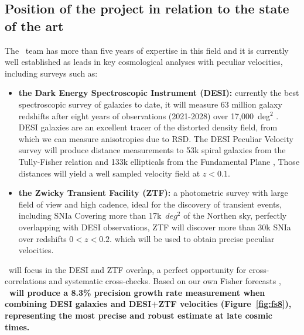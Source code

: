 

\subsection{Position of the project in relation to the state of the art}

The \projacro\ team has more than five years of expertise in this field and it is currently
well established as leads in key cosmological analyses with peculiar velocities, 
including surveys such as:
\begin{itemize}
  \item \textbf{the Dark Energy Spectroscopic Instrument (DESI):} 
  currently the best spectroscopic survey of galaxies to date, it will measure 
  63 million galaxy redshifts after eight years of observations (2021-2028) over 17,000~deg$^2$
  \cite{desicollaborationOverviewInstrumentationDark2022}.
  DESI galaxies are an excellent tracer of the distorted density field, 
  from which we can measure anisotropies due to RSD. 
  The DESI Peculiar Velocity survey will produce distance measurements to 
  53k spiral galaxies from the Tully-Fisher relation and 133k ellipticals 
  from the Fundamental Plane \cite{saulderTargetSelectionDESI2023},%
  Those distances will yield a well sampled velocity field at $z<0.1$.
  
  \item \textbf{the Zwicky Transient Facility (ZTF):} 
  a photometric survey with large field of view and high cadence, ideal for the 
  discovery of transient events, including SNIa \cite{bellmZwickyTransientFacility2019}%
  Covering more than 17k~$deg^2$ of the Northen sky, perfectly overlapping with DESI
  observations, ZTF will discover more than 30k SNIa over redshifts $0 < z < 0.2$. 
  which will be used to obtain precise peculiar velocities.
\end{itemize}
\projacro\ will focus in the DESI and ZTF overlap, a perfect opportunity for cross-correlations and systematic cross-checks. 
Based on our own Fisher forecasts \cite{carreresGrowthrateMeasurementTypeIa2023,ravouxGeneralizedFrameworkLikelihoodbased2025}, 
\textbf{\projacro\ will produce a 8.3\% precision growth rate measurement when combining DESI galaxies and DESI+ZTF velocities 
(Figure~\ref{fig:fs8}), representing the most precise and robust estimate at late cosmic times. }


